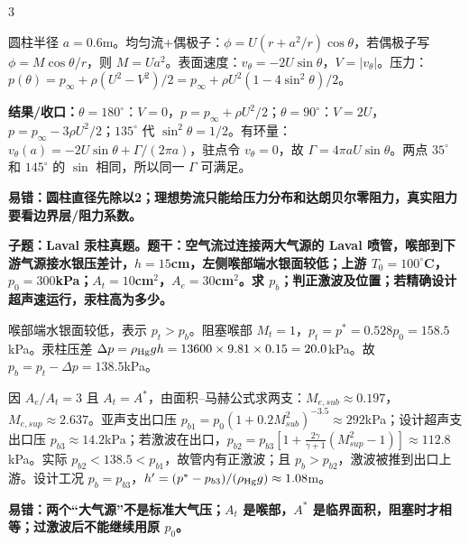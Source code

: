 \documentclass[a4paper]{article}
\newcommand{\qt}[1]{\vspace{0.10pt}\colorbox{Q}{\parbox{\dimexpr\linewidth-2\fboxsep}{\color{white}\bfseries #1}}\par}
\newcommand{\ans}[1]{\colorbox{G}{\parbox{\dimexpr\linewidth-2\fboxsep}{#1}}\par}
\newcommand{\warn}[1]{\colorbox{Y}{\parbox{\dimexpr\linewidth-2\fboxsep}{\color{E}\bfseries #1}}\par}
\newcommand{\res}[1]{{\color{E}\bfseries 结果/收口：}#1\par}
\begin{document}
\begin{multicols}{3}
\ans{圆柱半径 $a=0.6$m。均匀流+偶极子：$\phi=U(r+a^2/r)\cos\theta$，若偶极子写 $\phi=M\cos\theta/r$，则 $M=Ua^2$。表面速度：$v_\theta=-2U\sin\theta$，$V=|v_\theta|$。压力：$p(\theta)=p_\infty+\rho(U^2-V^2)/2=p_\infty+\rho U^2(1-4\sin^2\theta)/2$。}
\res{$\theta=180^\circ$：$V=0$，$p=p_\infty+\rho U^2/2$；$\theta=90^\circ$：$V=2U$，$p=p_\infty-3\rho U^2/2$；$135^\circ$ 代 $\sin^2\theta=1/2$。有环量：$v_\theta(a)=-2U\sin\theta+\Gamma/(2\pi a)$，驻点令 $v_\theta=0$，故 $\Gamma=4\pi aU\sin\theta$。两点 $35^\circ$ 和 $145^\circ$ 的 $\sin$ 相同，所以同一 $\Gamma$ 可满足。}
\warn{易错：圆柱直径先除以2；理想势流只能给压力分布和达朗贝尔零阻力，真实阻力要看边界层/阻力系数。}
\qt{子题：Laval 汞柱真题。题干：空气流过连接两大气源的 Laval 喷管，喉部到下游气源接水银压差计，$h=15$cm，左侧喉部端水银面较低；上游 $T_0=100^\circ$C，$p_0=300$kPa；$A_t=10$cm$^2$，$A_e=30$cm$^2$。求 $p_b$；判正激波及位置；若精确设计超声速运行，汞柱高为多少。}
\ans{喉部端水银面较低，表示 $p_t>p_b$。阻塞喉部 $M_t=1$，$p_t=p^*=0.528p_0=158.5$kPa。汞柱压差 $\Delta p=\rho_{\rm Hg}gh=13600\times9.81\times0.15=20.0$kPa。故 $p_b=p_t-\Delta p=138.5$kPa。}
\ans{因 $A_e/A_t=3$ 且 $A_t=A^*$，由面积--马赫公式求两支：$M_{e,sub}\approx0.197$，$M_{e,sup}\approx2.637$。亚声支出口压 $p_{b1}=p_0(1+0.2M_{sub}^2)^{-3.5}\approx292$kPa；设计超声支出口压 $p_{b3}\approx14.2$kPa；若激波在出口，$p_{b2}=p_{b3}[1+\frac{2\gamma}{\gamma+1}(M_{sup}^2-1)]\approx112.8$kPa。实际 $p_{b2}<138.5<p_{b1}$，故管内有正激波；且 $p_b>p_{b2}$，激波被推到出口上游。设计工况 $p_b=p_{b3}$，$h'=(p^*-p_{b3})/(\rho_{\rm Hg}g)\approx1.08$m。}
\warn{易错：两个“大气源”不是标准大气压；$A_t$ 是喉部，$A^*$ 是临界面积，阻塞时才相等；过激波后不能继续用原 $p_0$。}


\end{multicols}
\end{document}
